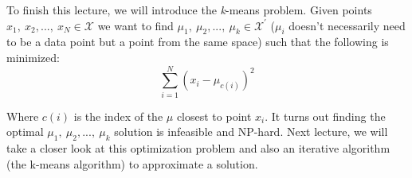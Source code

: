 \documentclass[english,course]{Notes}
\begin{document}
To finish this lecture, we will introduce the \textit{k}-means problem. Given points $x_1, \ x_2, ... , \ x_N \in \mathcal{X}$ we want to find $\mu_1, \ \mu_2, ... , \ \mu_k \in \mathcal{X}^\prime$ ($\mu_i$ doesn't necessarily need to be a data point but a point from the same space) such that the following is minimized:
\begin{equation}
\label{eq:transition1}
\sum_{i = 1}^N (x_i - \mu_{c(i)})^2
\end{equation}

Where $c(i)$ is the index of the $\mu$ closest to point $x_i$. It turns out finding the optimal $\mu_1, \ \mu_2, ... , \ \mu_k$ solution is infeasible and NP-hard. Next lecture, we will take a closer look at this optimization problem and also an iterative algorithm (the k-means algorithm) to approximate a solution.
\end{document}
